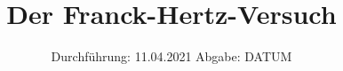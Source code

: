 

\subject{V601}
\title{Der Franck-Hertz-Versuch}
\date{%
  Durchführung: 11.04.2021
  \hspace{3em}
  Abgabe: DATUM
}



\maketitle
\thispagestyle{empty}
\tableofcontents
\newpage







\printbibliography{}


